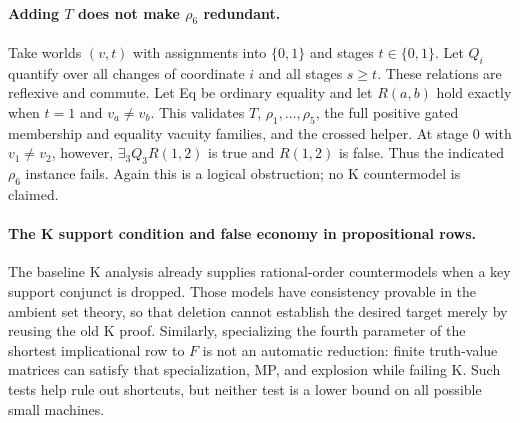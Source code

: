 \paragraph{Adding $T$ does not make $\rho_6$ redundant.}
Take worlds $(v,t)$ with assignments into $\{0,1\}$ and stages
$t\in\{0,1\}$.  Let $Q_i$ quantify over all changes of coordinate $i$
and all stages $s\ge t$.  These relations are reflexive and commute.
Let Eq be ordinary equality and let
$R(a,b)$ hold exactly when $t=1$ and $v_a\ne v_b$.
This validates $T$, $\rho_1,\ldots,\rho_5$, the full positive gated
membership and equality vacuity families, and the crossed helper.
At stage 0 with $v_1\ne v_2$, however,
$\exists_3Q_3R(1,2)$ is true and $R(1,2)$ is false.  Thus the indicated
$\rho_6$ instance fails.  Again this is a logical obstruction; no K
countermodel is claimed.

\paragraph{The K support condition and false economy in propositional rows.}
The baseline K analysis already supplies rational-order countermodels
when a key support conjunct is dropped.  Those models have consistency
provable in the ambient set theory, so that deletion cannot establish the
desired target merely by reusing the old K proof.  Similarly, specializing
the fourth parameter of the shortest implicational row to $F$ is not an
automatic reduction: finite truth-value matrices can satisfy that
specialization, MP, and explosion while failing K.  Such tests help rule
out shortcuts, but neither test is a lower bound on all possible small
machines.
